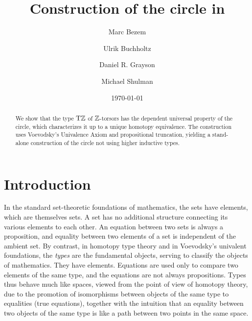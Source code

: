 \documentclass[a4paper,12pt]{amsart}
\begin{document}
\title{Construction of the circle in \UniMath}
{
    \author{Marc Bezem}
    \address{Department of Informatics, University of Bergen}
}
{
    \author{Ulrik Buchholtz}
    \address{Department of Mathematics, Technische Universit\"at Darmstadt}
}
{
    \author{Daniel R. Grayson}
}
{
    \author{Michael Shulman}
    \address{Department of Mathematics, University of San Diego}
}

\date{\today}

\begin{abstract}
We show that the type ${\mathrm{T}\mathbb{Z}}$ of $\mathbb{Z}$-torsors has the dependent universal property of the circle,
which characterizes it up to a unique homotopy equivalence.
The construction uses Voevodsky's Univalence Axiom and propositional truncation,
yielding a stand-alone construction of the
circle not using higher inductive types.
\end{abstract}

\maketitle
{}
\tableofcontents

\section{Introduction}

In the standard set-theoretic foundations of mathematics, the sets have elements, which are themselves sets.  A set has no additional structure
connecting its various elements to each other.  An equation between two sets is always a proposition, and equality between two elements of a set
is independent of the ambient set.  By contrast, in homotopy type theory and in Voevodsky's univalent foundations, the \emph{types} are the
fundamental objects, serving to classify the objects of mathematics.  They have elements.  Equations are used only to compare two elements of
the same type, and the equations are not always propositions.  Types thus behave much like spaces, viewed from the point of view of homotopy
theory, due to the promotion of isomorphisms between objects of the same type to equalities (true equations), together with the intuition that
an equality between two objects of the same type is like a path between two points in the same space.
\end{document}
